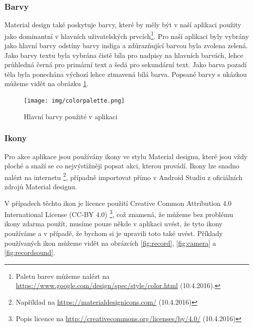\documentclass[czech,master,public,dept460,male,java,cpdeclaration]{diploma}
\begin{document}
\subsubsection{Barvy}
  Material design také poskytuje barvy, které by měly být v naší aplikaci použity jako dominantní v hlavních
  uživatelských prvcích\footnote{Paletu barev můžeme nalézt na \url{https://www.google.com/design/spec/style/color.html}  (10.4.2016).}.
  Pro naší aplikaci byly vybrány jako hlavní barvy odstíny barvy indiga a zdůrazňující barvou byla zvolena zelená.
  Jako barvy textu byla vybrána čistě bíla pro nadpisy na hlavních barvách, lehce průhledná černá pro
  primární text a šedá pro sekundární text. Jako barva pozadí těla byla ponechána výchozí lehce ztmavená bílá
  barva. Popsané barvy s ukázkou můžeme vidět na obrázku \ref{fig:colorpalette}.

  \begin{figure}[H]
          \centering
                  \texttt{[image: img/colorpalette.png]}
          \caption{Hlavní barvy použité v aplikaci}
          \label{fig:colorpalette}
  \end{figure}

\subsubsection{Ikony}
Pro akce aplikace jsou používány ikony ve stylu Material designu, které jsou vždy ploché
a snaží se co nejvýstižněji popsat akci, kterou provádí. Ikony lze snadno nalézt na internetu
\footnote{Například na \url{https://materialdesignicons.com/}  (10.4.2016)}, případně
importovat přímo v Android Studiu z oficiálních zdrojů Material designu.

V případech těchto ikon je licence použití Creative Common Attribution 4.0 International License (CC-BY 4.0)
\footnote{Popis licence na \url{http://creativecommons.org/licenses/by/4.0/}  (10.4.2016)}, což znamená,
že můžeme bez problému ikony zdarma použít, musíme pouze někde v aplikaci uvést, že tyto ikony
používáme a v případě, že bychom si je upravili toto také uvést.
Příklady používaných ikon můžeme vidět na obrázcích \ref{fig:record}, \ref{fig:camera} a \ref{fig:recordsound}.
\end{document}
